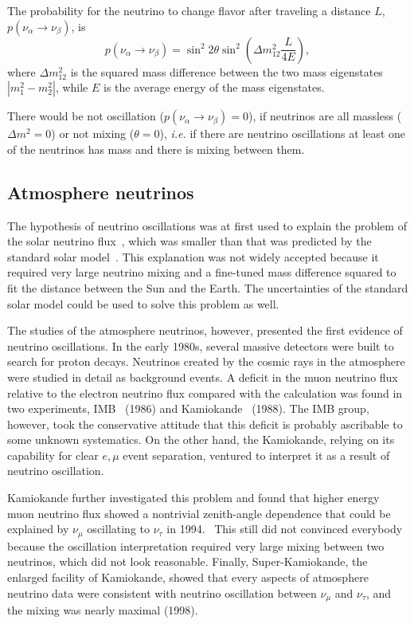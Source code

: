 The probability for the neutrino to change flavor after traveling a distance $L$, $p(\nu_\alpha \rightarrow \nu_\beta)$, is
\begin{equation}
  \label{eq:pa2b}
  p(\nu_\alpha \rightarrow \nu_\beta)=
  \sin^{2}2\theta\sin^{2}\left(\Delta m^{2}_{12}\frac{L}{4E}\right),
\end{equation}
where $\Delta m^{2}_{12}$ is the squared mass difference between the two mass eigenstates $|m^{2}_{1} - m^{2}_{2}|$, while $E$ is the average energy of the mass eigenstates.

There would be not oscillation ($p(\nu_\alpha \rightarrow \nu_\beta) = 0$), if neutrinos are all massless ($\Delta m^{2} = 0$) or not mixing ($\theta = 0$), \textit{i.e.} if there are neutrino oscillations at least one of the neutrinos has mass and there is mixing between them.

\subsection{Atmosphere neutrinos}
\label{sec:atmo}
The hypothesis of neutrino oscillations was at first used to explain the problem of the solar neutrino flux~\cite{Dav64,Dav68}, which was smaller than that was predicted by the standard solar model~\cite{Bah98}. This explanation was not widely accepted because it required very large neutrino mixing and a fine-tuned mass difference squared to fit the distance between the Sun and the Earth. The uncertainties of the standard solar model could be used to solve this problem as well.

The studies of the atmosphere neutrinos, however, presented the first evidence of neutrino oscillations. In the early 1980s, several massive detectors were built to search for proton decays. Neutrinos created by the cosmic rays in the atmosphere were studied in detail as background events. A deficit in the muon neutrino flux relative to the electron neutrino flux compared with the calculation was found in two experiments, IMB~\cite{Hai86} (1986) and Kamiokande~\cite{Hir88} (1988). The IMB group, however, took the conservative attitude that this deficit is probably ascribable to some unknown systematics. On the other hand, the Kamiokande, relying on its capability for clear $e, \mu$ event separation, ventured to interpret it as a result of neutrino oscillation.

Kamiokande further investigated this problem and found that higher energy muon neutrino flux showed a nontrivial zenith-angle dependence that could be explained by $\nu_\mu$ oscillating to $\nu_\tau$ in 1994.~\cite{Fuk94} This still did not convinced everybody because the oscillation interpretation required very large mixing between two neutrinos, which did not look reasonable. Finally, Super-Kamiokande, the enlarged facility of Kamiokande, showed that every aspects of atmosphere neutrino data were consistent with neutrino oscillation between $\nu_\mu$ and $\nu_\tau$, and the mixing was nearly maximal (1998).~\cite{Fuk98}

